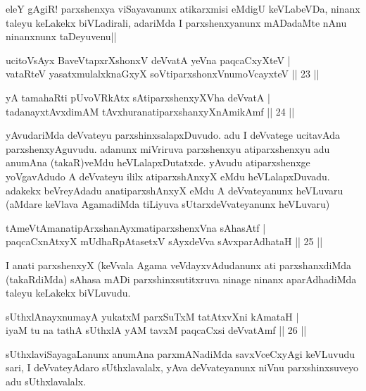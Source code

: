 \begin{artha}
eleY gAgiR! parxshenxya viSayavanunx atikarxmisi eMdigU keVLabeVDa, ninanx taleyu keLakekx biVLadirali, adariMda I parxshenxyanunx mADadaMte nAnu ninanxnunx taDeyuvenu||
\end{artha}


\begin{shl}
ucitoV\s sAyx BaveVtapxrXshonxV deVvatA yeVna paqcaCxyXteV |\\
vataRteV yasatxmulalxknaGxyX soV\s tiparxshonxV\s numoVcayxteV \hfill || 23 ||
\end{shl}

\begin{shl}
yA tamahaRti pUvoVRkAtx sA\s tiparxshenxyXVha deVvatA |\\
tadanayxtAvxdimAM tAvxhuranatiparxshanxyXnAmikAmf \hfill || 24 ||
\end{shl}

\begin{artha}
yAvudariMda deVvateyu parxshinxsalapxDuvudo. adu I deVvatege ucitavAda parxshenxyAguvudu. adanunx miVriruva parxshenxyu atiparxshenxyu adu anumAna (takaR)veMdu heVLalapxDutatxde. yAvudu atiparxshenxge yoVgavAdudo A deVvateyu ililx atiparxshAnxyX eMdu heVLalapxDuvadu. adakekx beVreyAdadu anatiparxshAnxyX eMdu A deVvateyanunx heVLuvaru (aMdare keVlava AgamadiMda tiLiyuva sUtarxdeVvateyanunx heVLuvaru)
\end{artha}%

\begin{shl}
tAmeVtAmanatipArxshanAyxmatiparxshenxVna sAhasAtf |\\
paqcaCxnAtxyX mUdhaRpAtasetxV sAyxdeVva sAvxparAdhataH \hfill || 25 ||
\end{shl}

\begin{artha}
I anati parxshenxyX (keVvala Agama veVdayxvAdudanunx ati parxshanxdiMda (takaRdiMda) sAhasa mADi parxshinxsutitxruva ninage ninanx aparAdhadiMda taleyu keLakekx biVLuvudu.
\end{artha}

\begin{shl}
sUthxlAnayxnumayA yukatxM parxSuTxM tatAtxvXni kAmataH |\\
iyaM tu na tathA sUthxlA yAM tavxM paqcaCxsi deVvatAmf \hfill || 26 ||
\end{shl}

\begin{artha}
sUthxlaviSayagaLanunx anumAna parxmANadiMda savxVceCxyAgi keVLuvudu sari, I deVvateyAdaro sUthxlavalalx, yAva deVvateyanunx niVnu parxshinxsuveyo adu sUthxlavalalx.
\end{artha}

